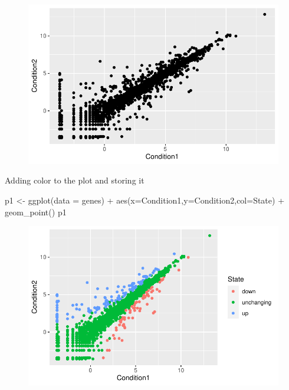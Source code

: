 \documentclass[
  letterpaper,
  DIV=11,
  numbers=noendperiod]{scrartcl}
\newenvironment{Shaded}{\begin{snugshade}}{\end{snugshade}}
\newcommand{\AttributeTok}[1]{\textcolor[rgb]{0.40,0.45,0.13}{#1}}
\newcommand{\FunctionTok}[1]{\textcolor[rgb]{0.28,0.35,0.67}{#1}}
\newcommand{\NormalTok}[1]{\textcolor[rgb]{0.00,0.23,0.31}{#1}}
\newcommand{\OtherTok}[1]{\textcolor[rgb]{0.00,0.23,0.31}{#1}}
\newcommand{\SpecialCharTok}[1]{\textcolor[rgb]{0.37,0.37,0.37}{#1}}
\begin{document}
\begin{figure}[H]

{\centering \includegraphics{class05_labreport_files/figure-pdf/unnamed-chunk-10-1.pdf}

}

\end{figure}

Adding color to the plot and storing it

\begin{Shaded}
\begin{Highlighting}[]
\NormalTok{p1 }\OtherTok{\textless{}{-}} \FunctionTok{ggplot}\NormalTok{(}\AttributeTok{data =}\NormalTok{ genes) }\SpecialCharTok{+} 
  \FunctionTok{aes}\NormalTok{(}\AttributeTok{x=}\NormalTok{Condition1,}\AttributeTok{y=}\NormalTok{Condition2,}\AttributeTok{col=}\NormalTok{State) }\SpecialCharTok{+} 
  \FunctionTok{geom\_point}\NormalTok{()}
\NormalTok{p1}
\end{Highlighting}
\end{Shaded}

\begin{figure}[H]

{\centering \includegraphics{class05_labreport_files/figure-pdf/unnamed-chunk-11-1.pdf}

}

\end{figure}
\end{document}

